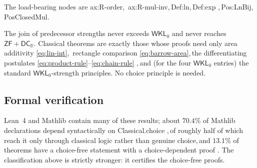 \documentclass[11pt,reqno]{amsart}
\providecommand{\R}{\mathbb{R}}
\theoremstyle{redplain}
\begin{document}
The load-bearing nodes are \textsf{ax:R-order},\,\allowbreak \textsf{%
ax:R-mul-inv},\,\allowbreak \textsf{Def:ln},\,\allowbreak \textsf{Def:exp}%
,\,\allowbreak \textsf{Pos:LnBij},\,\allowbreak \textsf{PosClosedMul}.

The join of predecessor strengths never exceeds $\mathsf{WKL}_0$ and never
reaches $\mathsf{ZF}+\mathsf{DC}_\R$. Classical theorems are exactly those
whose proofs need only area additivity \autoref{eq:lin-int},\,\allowbreak
rectangle comparison \autoref{eq:barrow-area},\,\allowbreak the
differentiating postulates \autoref{eq:product-rule}--\autoref{eq:chain-rule}%
,\,\allowbreak and (for the four $\mathsf{WKL}_0$ entries) the standard $%
\mathsf{WKL}_0$-strength principles. No choice principle is needed. 
\endgroup

\subsection{Formal verification}

Lean~4 and Mathlib \cite{Lean4} contain many of these results; about $70.4\%$
of Mathlib declarations depend syntactically on \textsf{Classical.choice}%
,\,\allowbreak of roughly half of which reach it only through classical
logic rather than genuine choice,\,\allowbreak and $13.1\%$ of theorems have
a choice-free statement with a choice-dependent proof \cite{Crossref2026}.
The classification above is strictly stronger: it certifies the choice-free
proofs.
\end{document}
